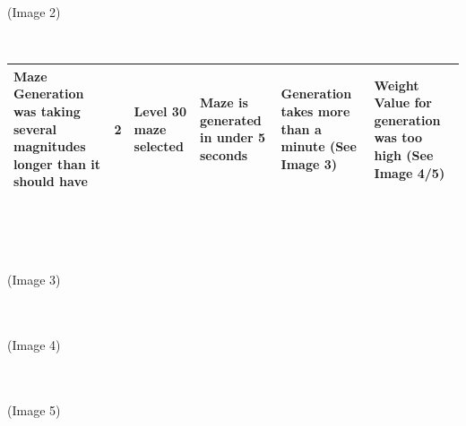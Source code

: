 \documentclass{article}
\begin{document}
\begin{center}
\\
\vphantom{0}
\\
\color{mygrey}(Image 2)
\end{center}

\vphantom{0}
\\
\begin{tabular}{|P{3.5cm}|P{0.8cm}|P{3cm}|P{4cm}|P{3cm}|P{3cm}| }
\hline
 Maze Generation was taking several magnitudes longer than it should have & 2 & Level 30 maze selected & Maze is generated in under 5 seconds & Generation takes more than a minute (See Image 3) & Weight Value for generation was too high (See Image 4/5) \\
\hline
\end{tabular}
\\
\begin{center}
\\
\vphantom{0}
\\
\color{mygrey}(Image 3)
\end{center}

\begin{center}
\\
\vphantom{0}
\\
\color{mygrey}(Image 4)
\end{center}

\begin{center}
\\
\vphantom{0}
\\
\color{mygrey}(Image 5)
\end{center}


\clearpage
\end{document}
